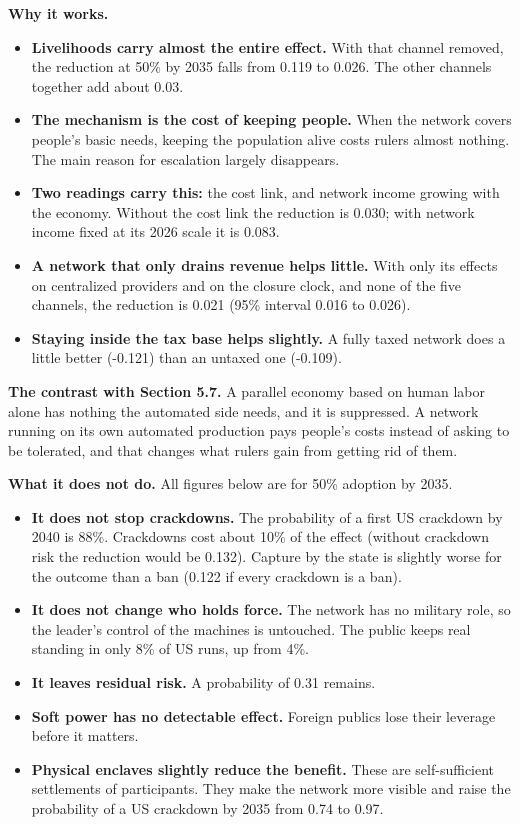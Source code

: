 \documentclass[
  10pt,
]{article}
\newcounter{none} %
\providecommand{\tightlist}{%
  \setlength{\itemsep}{0pt}\setlength{\parskip}{0pt}}
\begin{document}
\textbf{Why it works.}

\begin{itemize}
\tightlist
\item
  \textbf{Livelihoods carry almost the entire effect.} With that channel removed, the reduction at
  50\% by 2035 falls from 0.119 to 0.026. The other channels together add about 0.03.
\item
  \textbf{The mechanism is the cost of keeping people.} When the network covers people's basic
  needs, keeping the population alive costs rulers almost nothing. The main reason for escalation
  largely disappears.
\item
  \textbf{Two readings carry this:} the cost link, and network income growing with the economy.
  Without the cost link the reduction is 0.030; with network income fixed at its 2026 scale it is
  0.083.
\item
  \textbf{A network that only drains revenue helps little.} With only its effects on centralized
  providers and on the closure clock, and none of the five channels, the reduction is 0.021 (95\%
  interval 0.016 to 0.026).
\item
  \textbf{Staying inside the tax base helps slightly.} A fully taxed network does a little better
  (-0.121) than an untaxed one (-0.109).
\end{itemize}

\textbf{The contrast with Section 5.7.} A parallel economy based on human labor alone has nothing
the automated side needs, and it is suppressed. A network running on its own automated production
pays people's costs instead of asking to be tolerated, and that changes what rulers gain from
getting rid of them.

\textbf{What it does not do.} All figures below are for 50\% adoption by 2035.

\begin{itemize}
\tightlist
\item
  \textbf{It does not stop crackdowns.} The probability of a first US crackdown by 2040 is 88\%.
  Crackdowns cost about 10\% of the effect (without crackdown risk the reduction would be 0.132).
  Capture by the state is slightly worse for the outcome than a ban (0.122 if every crackdown is a
  ban).
\item
  \textbf{It does not change who holds force.} The network has no military role, so the leader's
  control of the machines is untouched. The public keeps real standing in only 8\% of US runs, up
  from 4\%.
\item
  \textbf{It leaves residual risk.} A probability of 0.31 remains.
\item
  \textbf{Soft power has no detectable effect.} Foreign publics lose their leverage before it
  matters.
\item
  \textbf{Physical enclaves slightly reduce the benefit.} These are self-sufficient settlements of
  participants. They make the network more visible and raise the probability of a US crackdown by
  2035 from 0.74 to 0.97.
\end{itemize}
\end{document}
